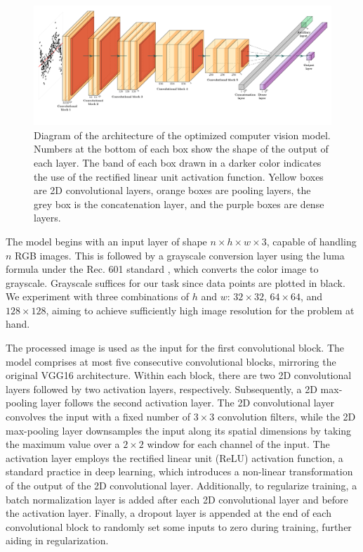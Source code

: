 \documentclass[]{interact}
\theoremstyle{plain}%
\theoremstyle{definition}
\theoremstyle{remark}
\begin{document}
\begin{figure}[!h]

{\centering \includegraphics[width=1\linewidth]{figures/cnn} 

}

\caption{Diagram of the architecture of the optimized computer vision model. Numbers at the bottom of each box show the shape of the output of each layer. The band of each box drawn in a darker color indicates the use of the rectified linear unit activation function.  Yellow boxes are 2D convolutional layers, orange boxes are pooling layers, the grey box is the concatenation layer, and the purple boxes are dense layers.}\label{fig:cnn-diag}
\end{figure}

The model begins with an input layer of shape
\(n \times h \times w \times 3\), capable of handling \(n\) RGB images.
This is followed by a grayscale conversion layer using the luma formula
under the Rec. 601 standard \citep{series2011studio}, which converts the
color image to grayscale. Grayscale suffices for our task since data
points are plotted in black. We experiment with three combinations of
\(h\) and \(w\): \(32 \times 32\), \(64 \times 64\), and
\(128 \times 128\), aiming to achieve sufficiently high image resolution
for the problem at hand.

The processed image is used as the input for the first convolutional
block. The model comprises at most five consecutive convolutional
blocks, mirroring the original VGG16 architecture. Within each block,
there are two 2D convolutional layers followed by two activation layers,
respectively. Subsequently, a 2D max-pooling layer follows the second
activation layer. The 2D convolutional layer convolves the input with a
fixed number of \(3 \times 3\) convolution filters, while the 2D
max-pooling layer downsamples the input along its spatial dimensions by
taking the maximum value over a \(2 \times 2\) window for each channel
of the input. The activation layer employs the rectified linear unit
(ReLU) activation function, a standard practice in deep learning, which
introduces a non-linear transformation of the output of the 2D
convolutional layer. Additionally, to regularize training, a batch
normalization layer is added after each 2D convolutional layer and
before the activation layer. Finally, a dropout layer is appended at the
end of each convolutional block to randomly set some inputs to zero
during training, further aiding in regularization.
\end{document}
